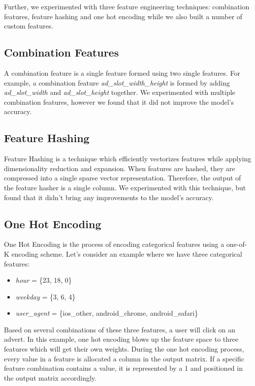 \documentclass{article} %
\begin{document}
Further, we experimented with three feature engineering techniques: combination features, feature hashing and one hot encoding while we also built a number of custom features.

\subsection{Combination Features}

A combination feature is a single feature formed using two single features. For example, a combination feature \textit{ad\_slot\_width\_height} is formed by adding \textit{ad\_slot\_width} and \textit{ad\_slot\_height} together. We experimented with multiple combination features, however we found that it did not improve the model's accuracy.

\subsection{Feature Hashing}

Feature Hashing is a technique which efficiently vectorizes features while applying dimensionality reduction and expansion. When features are hashed, they are compressed into a single sparse vector representation. Therefore, the output of the feature hasher is a single column. We experimented with this technique, but found that it didn't bring any improvements to the model's accuracy.

\subsection{One Hot Encoding}

One Hot Encoding is the process of encoding categorical features using a one-of-K encoding scheme. Let's consider an example where we have three categorical features:

\begin{itemize}
    \item \textit{hour} = \{23, 18, 0\}
    \item \textit{weekday} = \{3, 6, 4\}
    \item \textit{user\_agent} = \{ios\_other, android\_chrome, android\_safari\}
\end{itemize}

Based on several combinations of these three features, a user will click on an advert. In this example, one hot encoding blows up the feature space to three features which will get their own weights. During the one hot encoding process, every value in a feature is allocated a column in the output matrix. If a specific feature combination contains a value, it is represented by a 1 and positioned in the output matrix accordingly.
\end{document}
